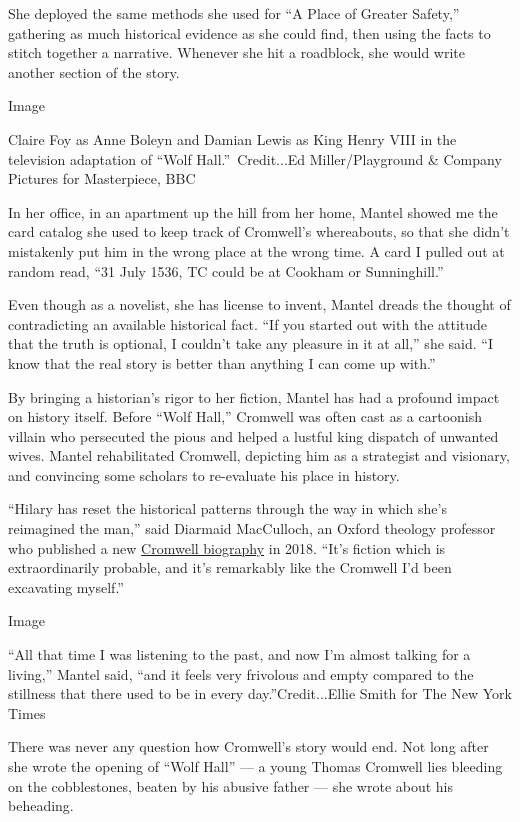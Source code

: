 She deployed the same methods she used for ``A Place of Greater
Safety,'' gathering as much historical evidence as she could find, then
using the facts to stitch together a narrative. Whenever she hit a
roadblock, she would write another section of the story.

Image

Claire Foy as Anne Boleyn and Damian Lewis as King Henry VIII in the
television adaptation of ``Wolf Hall.''~Credit...Ed Miller/Playground \&
Company Pictures for Masterpiece, BBC

In her office, in an apartment up the hill from her home, Mantel showed
me the card catalog she used to keep track of Cromwell's whereabouts, so
that she didn't mistakenly put him in the wrong place at the wrong time.
A card I pulled out at random read, ``31 July 1536, TC could be at
Cookham or Sunninghill.''

Even though as a novelist, she has license to invent, Mantel dreads the
thought of contradicting an available historical fact. ``If you started
out with the attitude that the truth is optional, I couldn't take any
pleasure in it at all,'' she said. ``I know that the real story is
better than anything I can come up with.''

By bringing a historian's rigor to her fiction, Mantel has had a
profound impact on history itself. Before ``Wolf Hall,'' Cromwell was
often cast as a cartoonish villain who persecuted the pious and helped a
lustful king dispatch of unwanted wives. Mantel rehabilitated Cromwell,
depicting him as a strategist and visionary, and convincing some
scholars to re-evaluate his place in history.

``Hilary has reset the historical patterns through the way in which
she's reimagined the man,'' said Diarmaid MacCulloch, an Oxford theology
professor who published a new
\href{https://www.theguardian.com/books/2018/sep/22/thomas-cromwell-life-diarmaid-maccolloch-review}{Cromwell
biography} in 2018. ``It's fiction which is extraordinarily probable,
and it's remarkably like the Cromwell I'd been excavating myself.''

Image

``All that time I was listening to the past, and now I'm almost talking
for a living,'' Mantel said, ``and it feels very frivolous and empty
compared to the stillness that there used to be in every
day.''Credit...Ellie Smith for The New York Times

There was never any question how Cromwell's story would end. Not long
after she wrote the opening of ``Wolf Hall'' --- a young Thomas Cromwell
lies bleeding on the cobblestones, beaten by his abusive father --- she
wrote about his beheading.

